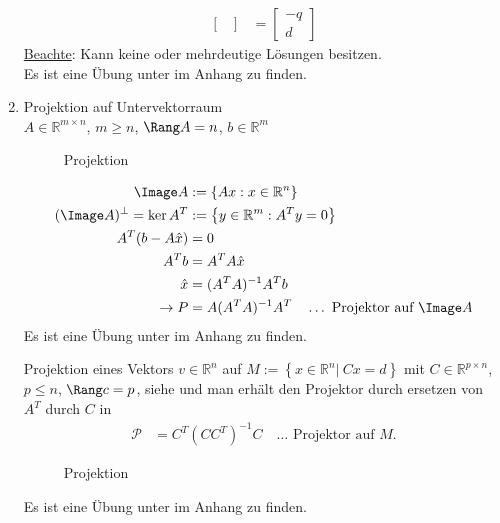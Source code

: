 \begin{enumerate}[label=(\arabic*)]
\begin{align*}
\begin{bmatrix}
  \end{bmatrix} & = \begin{bmatrix}
  -q \\ d
  \end{bmatrix}
  \end{align*}
  \underline{Beachte}: Kann keine oder mehrdeutige Lösungen besitzen.\\
  Es ist eine Übung unter  im Anhang zu finden.
  \item Projektion auf Untervektorraum\\
  		$A\in\mathbb{R}^{m\times n}$, $m\ge n$, $\Rang A=n$, $b\in\mathbb{R}^m$\\
  		\begin{figure}[!htb]
			\centering
			
			\caption{Projektion}
			\label{fig:kap_1_projektion}
		\end{figure}
  		\begin{align}
  			\Image A & := \left\{Ax:x\in\mathbb{R}^n \right\} \notag\\
  			(\Image A)^{\bot} =\ker A^T & := \left\{y\in\mathbb{R}^m:A^Ty=0 \right\}\notag\\
  			A^T(b-A\hat{x}) & = 0\notag\\
  			A^Tb & = A^TA\hat{x}\notag\\
  			\hat{x} & = (A^TA)^{-1}A^Tb\notag\\ 
  			\rightarrow P & = A(A^TA)^{-1}A^T\quad \ldots\text{ Projektor auf $\Image A$} \label{eq:kap_1_projektion}
  		\end{align}
  		Es ist eine Übung unter  im Anhang zu finden.
  		
  		Projektion eines Vektors $v\in\mathbb{R}^n$ auf $M:=\left\{x\in\mathbb{R}^n|\ Cx=d \right\}$ mit $C\in\mathbb{R}^{p\times n}$, $p\le n$, $\Rang c = p$, siehe
  		 und man erhält den Projektor durch ersetzen von $A^T$ durch $C$ in 
  		\begin{align*}
  			\mathcal{P} & = C^T(CC^T)^{-1}C\quad \ldots\text{ Projektor auf $M$}. 
  		\end{align*}
  		\begin{figure}[!htb]
			\centering
			
			\caption{Projektion}
			\label{fig:kap_1_projektion}
		\end{figure}
  		Es ist eine Übung unter  im Anhang zu finden.
\end{enumerate}

